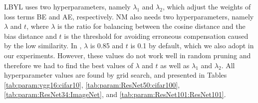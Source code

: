 




LBYL uses two hyperparameters, namely $\lambda_1$ and $\lambda_2$, which adjust the weights of loss terms BE and AE, respectively. NM \cite{NM} also needs two hyperparameters, namely $\lambda$ and $t$, where $\lambda$ is the ratio for balancing between the cosine distance and the bias distance and $t$ is the threshold for avoiding erroneous compensation caused by the low similarity. In \cite{NM}, $\lambda$ is 0.85 and $t$ is 0.1 by default, which we also adopt in our experiments. However, these values do not work well in random pruning and therefore we had to find the best values of $\lambda$ and $t$ as well as $\lambda_1$ and $\lambda_2$. All hyperparameter values are found by grid search, and presented in Tables \ref{tab:param:vgg16:cifar10}, \ref{tab:param:ResNet50:cifar100}, \ref{tab:param:ResNet34:ImageNet}, and \ref{tab:param:ResNet101:ResNet101}.


